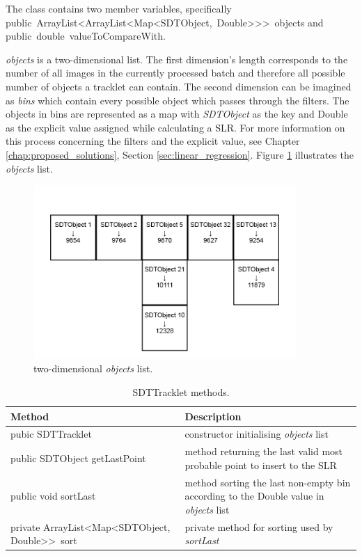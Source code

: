 	The class contains two member variables, specifically \newline \mbox{public ArrayList<ArrayList<Map<SDTObject, Double>{}>{}> objects} \newline and \mbox{public double valueToCompareWith}.
	
	\emph{objects} is a two-dimensional list. The first dimension's length corresponds to the number of all images in the currently processed batch and therefore all possible number of objects a tracklet can contain. The second dimension can be imagined as \emph{bins} which contain every possible object which passes through the filters. The objects in bins are represented as a map with \emph{SDTObject} as the key and Double as the explicit value assigned while calculating a SLR. For more information on this process concerning the filters and the explicit value, see Chapter \ref{chap:proposed_solutions}, Section \ref{sec:linear_regression}. Figure \ref{fig:2dbins} illustrates the \emph{objects} list.
	
	\begin{figure}[H]
	\centering
	  \includegraphics[width=10cm]{images/2dbins}
		  \caption{two-dimensional \emph{objects} list.}
	  \label{fig:2dbins}
	\end{figure}

\begin{table}[H]
\centering
\setlength{\extrarowheight}{2pt}
\begin{tabularx}{\textwidth}{|X|X|}
\hline
\textbf{Method} & \textbf{Description} \\ \hline
pubic \mbox{SDTTracklet} & constructor initialising \emph{objects} list \\ \hline
public SDTObject \mbox{getLastPoint} & method returning the last valid most probable point to insert to the SLR \\ \hline
public void \mbox{sortLast} & method sorting the last non-empty bin according to the Double value in \emph{objects} list \\ \hline
private \mbox{ArrayList<Map<SDTObject,} \mbox{Double>{}> sort} & private method for sorting used by \emph{sortLast} \\ \hline
\end{tabularx}
\caption{SDTTracklet methods.}
\label{tab:class_methods_T}
\end{table}

